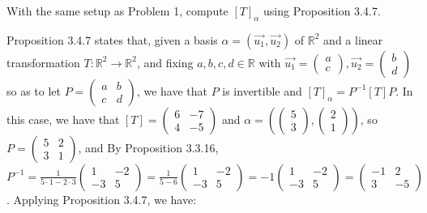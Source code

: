 \documentclass[12pt]{article}
\newenvironment{problem}[2][Problem]
{
	\begin{trivlist} 
		\item[\hskip \labelsep {\bfseries #1 #2:}]
	}
{
	\end{trivlist}
	}
\newenvironment{solution}[1][Solution]
{
	\begin{trivlist} 
		\item[\hskip \labelsep {\itshape #1:}]
	}
	{
	\end{trivlist}
}
\begin{document}
\newpage
\begin{problem}{2}
With the same setup as Problem 1, compute $[T]_{\alpha}$ using Proposition 3.4.7.
\noindent
\newline
\newline

\begin{solution}
Proposition 3.4.7 states that, given a basis $\alpha = (\vec{u_{1}},\vec{u_{2}})$ of $\mathbb{R}^2$ and a linear transformation $T:\mathbb{R}^2 \to \mathbb{R}^2$, and fixing $a,b,c,d \in \mathbb{R}$ with $\vec{u_{1}}=\begin{pmatrix}a\\c\end{pmatrix}, \vec{u_{2}}=\begin{pmatrix}b\\d\end{pmatrix}$ so as to let $P = \begin{pmatrix} a &b\\c&d\end{pmatrix}$, we have that $P$ is invertible and $[T]_{\alpha} = P^{-1} [T]P$. In this case, we have that $[T]=\begin{pmatrix}6&-7\\4&-5\end{pmatrix}$ and $\alpha=\left( \begin{pmatrix}5\\3\end{pmatrix} ,\begin{pmatrix}2\\1\end{pmatrix} \right)$, so $P= \begin{pmatrix}5&2\\3&1\end{pmatrix}$, and By Proposition 3.3.16, $P^{-1} = \frac{1}{5\cdot 1 - 2\cdot 3} \begin{pmatrix} 1 & -2 \\ -3&5\end{pmatrix} = \frac{1}{5-6}  \begin{pmatrix} 1 & -2 \\ -3&5\end{pmatrix} = -1  \begin{pmatrix} 1 & -2 \\ -3&5\end{pmatrix} =  \begin{pmatrix} -1 & 2 \\ 3&-5\end{pmatrix}$. Applying Proposition 3.4.7, we have:

\end{solution}
\end{problem}
\end{document}
